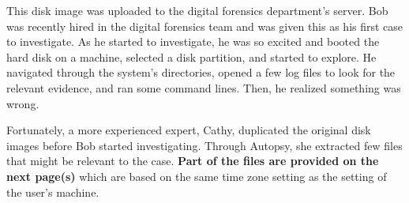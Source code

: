 \documentclass[addpoints]{exam}
\begin{document}
\begin{questions}
This disk image was uploaded to the digital forensics department's
server. Bob was recently hired in the digital forensics team and was
given this as his first case to investigate. As he started to
investigate, he was so excited and booted the hard disk on a machine,
selected a disk partition, and started to explore. He navigated
through the system's directories, opened a few log files to look for
the relevant evidence, and ran some command lines. Then, he realized
something was wrong.

Fortunately, a more experienced expert, Cathy, duplicated the original
disk images before Bob started investigating. Through Autopsy, she
extracted few files that might be relevant to the case. \textbf{Part
  of the files are provided on the next page(s)} which are based on
the same time zone setting as the setting of the user's machine.

\end{questions}
\end{document}
